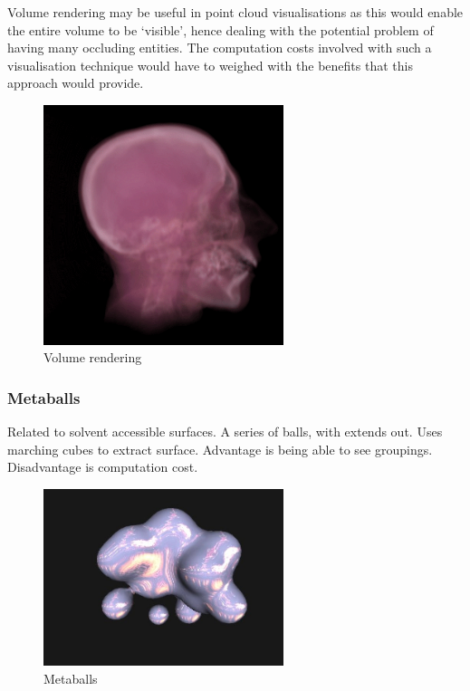 Volume rendering may be useful in point cloud visualisations as this would
enable the entire volume to be `visible', hence dealing with the potential
problem of having many occluding entities. The computation costs involved with
such a visualisation technique would have to weighed with the benefits that this
approach would provide.

\begin{figure}[h!]
  \begin{center}
    \includegraphics[width=70mm]{head_volume}
  \end{center}
  \caption{Volume rendering}
  \label{fig:headvolume}
\end{figure}


\subsubsection*{Metaballs}
\label{ssub:metaballs}

Related to solvent accessible surfaces.
A series of balls, with extends out.
Uses marching cubes to extract surface.
Advantage is being able to see groupings.
Disadvantage is computation cost.

\begin{figure}[h!]
  \begin{center}
    \includegraphics[width=70mm]{metaballs}
  \end{center}
  \caption{Metaballs}
  \label{fig:metaballs}
\end{figure}

